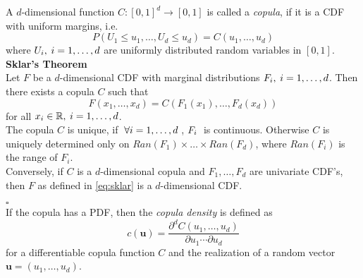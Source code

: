 
A $d$-dimensional function $C: [0,1]^d \rightarrow [0,1]$ is called a \textit{copula}, if it is a \ac{CDF} with uniform margins, i.e.
\begin{equation*}
P\left(U_{1} \leq u_{1}, \ldots, U_{d} \leq u_{d}\right)=C\left(u_{1}, \ldots, u_{d}\right)
\end{equation*}
where 
$ U_{i}, \hspace{0.25em} i = 1, \ldots, d $ 
are uniformly distributed random variables in $[0,1]$.\\

\textbf{Sklar's Theorem} \\
Let $F$ be a $d$-dimensional \ac{CDF} with marginal distributions $F_{i}, \hspace{0.25em} i = 1, \ldots, d$.
Then there exists a copula $C$ such that
\begin{equation}
F(x_1, \ldots, x_d) = C (F_1(x_1), \ldots, F_d(x_d))
\label{eq:sklar}
\end{equation}
for all $x_i \in \mathbb{R}, \hspace{0.25em} i = 1, \ldots, d $.\\
The copula $C$ is unique, if $ \hspace{0.25em} \forall i = 1, \ldots, d \hspace{0.25em}$,  $F_i \hspace{0.25em}$  is continuous. Otherwise $C$ is uniquely determined only on
$Ran(F_1) \times \ldots \times Ran(F_d)$, where $Ran(F_{i})$ is the range of $F_i$.\\
Conversely, if $C$ is a $d$-dimensional copula and $F_1, \ldots, F_d$ are univariate \ac{CDF}'s, then $F$ as defined in \autoref{eq:sklar} is a 
$d$-dimensional \ac{CDF}.

\hfill $\square$ \\


If the copula has a \ac{PDF}, then the \textit{copula density} is defined as
\begin{equation}
c(\mathbf{u})=\frac{\partial^{d} C\left(u_{1}, \ldots, u_{d}\right)}{\partial u_{1} \cdots \partial u_{d}} 
\label{eq:copula_density_1}
\end{equation}
for a differentiable copula function $C$ and the realization of a random vector $ \bm{u} = (u_1, \ldots, u_d)$.\\

